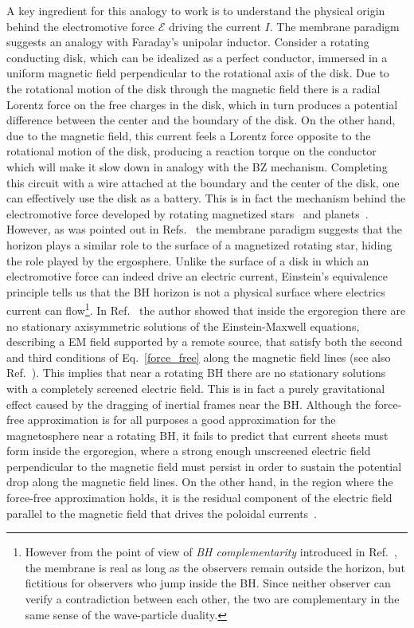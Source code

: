 \documentclass[11pt]{article}
\numberwithin{equation}{section} %
\begin{document}
A key ingredient for this analogy to work is to understand the physical origin behind the electromotive force 
$\mathcal{E}$ driving the current $I$. The membrane paradigm suggests an analogy with Faraday's unipolar inductor. 
Consider a rotating conducting disk, which can be idealized as a perfect conductor, immersed in a uniform magnetic field 
perpendicular to the rotational axis of the disk. Due to the rotational motion of the disk through the magnetic field 
there is a radial Lorentz force on the free charges in the disk, which in turn produces a potential difference between 
the center and the boundary of the disk. On the other hand, due to the magnetic field, this current feels a Lorentz 
force opposite to the rotational motion of the disk, producing a reaction torque on the conductor which will make it 
slow down in analogy with the BZ mechanism. Completing this circuit with a wire attached at the boundary and the center 
of the disk, one can effectively use the disk as a battery. 
This is in fact the mechanism behind the electromotive force developed by rotating magnetized 
stars~\cite{Goldreich:1969sb,Ruderman:1975ju} and planets~\cite{1969ApJ...156...59G}. However, as was pointed out in 
Refs.~\cite{Komissarov:2004ms,Komissarov:2008yh} the membrane paradigm suggests that the horizon plays a similar role 
to 
the surface of a magnetized rotating star, hiding the role played by the ergosphere. Unlike the surface of a disk in 
which an electromotive force can indeed drive an electric current, Einstein's equivalence principle tells us that the 
BH 
horizon is not a physical surface where electrics current can flow\footnote{However from the point of view of \emph{BH 
complementarity} introduced in Ref.~\cite{Susskind:1993if}, the membrane is real as long as the observers remain 
outside 
the horizon, but fictitious for observers who jump inside the BH. Since neither observer can verify a contradiction 
between each other, the two are complementary in the same sense of the wave-particle duality.}. In 
Ref.~\cite{Komissarov:2004ms} the author showed that inside the ergoregion there are no stationary axisymmetric 
solutions
of the Einstein-Maxwell equations, describing a EM field supported by a remote source, that satisfy both the second and 
third conditions of Eq.~\eqref{force_free} along the magnetic field lines (see also 
Ref.~\cite{Toma:2014kva,Ruiz:2012te}). This implies that near a rotating BH there are no stationary solutions with a 
completely screened electric field. This is in fact a purely gravitational effect caused by the dragging of inertial 
frames near the BH. Although the force-free approximation is for all purposes a good approximation for the 
magnetosphere 
near a rotating BH, it fails to predict that current sheets must form inside the ergoregion, where a strong enough 
unscreened electric field perpendicular to the magnetic field must persist in order to sustain the potential drop along 
the magnetic field lines. On the other hand, in the region where the force-free approximation holds, it is the residual 
component of the electric field parallel to the magnetic field that drives the poloidal 
currents~\cite{Komissarov:2004ms}.
\end{document}
